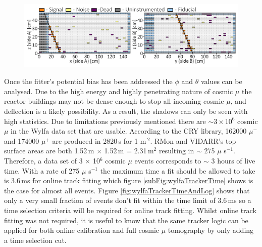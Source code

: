 \begin{figure}[!h]
 \centering
 \includegraphics[width=\linewidth]{Chapter6/Figs/Raster/newExampleEventWylfaMedText.png}
 \label{fig:3000ExampleEventWithKey}
\end{figure}

Once the fitter's potential bias has been addressed the $\phi$ and $\theta$ values can be analysed. Due to the high energy and highly penetrating nature of cosmic $\mu$ \cite{Olive_2014} the reactor buildings may not be dense enough to stop all incoming cosmic $\mu$, and deflection is a likely possibility. As a result, the shadows can only be seen with high statistics. Due to limitations previously mentioned there are $\sim 3 \times 10^6$ cosmic $\mu$ in the Wylfa data set that are usable. According to the CRY library, \cite{ieee_cry_2007} 162000 $\mu^-$ and 174000 $\mu^+$ are produced in 2820\,s for 1 m\,$^2$. RMon and VIDARR's top surface areas are both 1.52\,m $\times$ 1.52\,m = 2.31\,m$^2$ resulting in $\sim$ 275 $\mu$ s$^{-1}$. Therefore, a data set of 3 $\times$ 10$^6$ cosmic $\mu$ events corresponds to $\sim$ 3 hours of live time. With a rate of 275 $\mu$ s$^{-1}$ the maximum time a fit should be allowed to take is 3.6\,ms for online track fitting which figure \ref{subFig:wylfaTrackerTime} shows is the case for almost all events. Figure \ref{fig:wylfaTrackerTimeAndLog} shows that only a very small fraction of events don't fit within the time limit of 3.6\,ms so a time selection criteria will be required for online track fitting. Whilst online track fitting was not required, it is useful to know that the same tracker logic can be applied for both online calibration and full cosmic $\mu$ tomography by only adding a time selection cut. 


